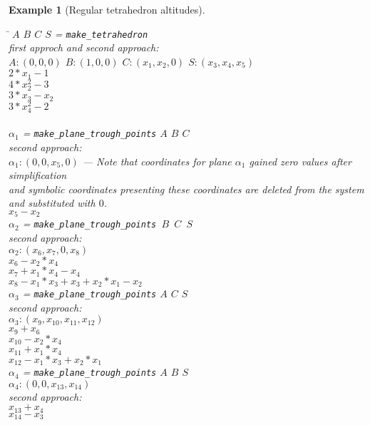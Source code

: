 \documentclass[final,1p,times,authoryear]{elsarticle}
\newtheorem{example}[theorem]{Example}
\begin{document}
\begin{example}[Regular tetrahedron altitudes]
\begin{footnotesize}
\begin{tabbing}
\hspace{5mm}\=\kill
\> $A$ $B$ $C$ $S$ = {\tt make\_tetrahedron}\\
  first approch and second approach: \\
  $A: (0, 0, 0)$ $ B: (1, 0, 0)$  $C: (x_1, x_2, 0)$ $S: (x_3, x_4, x_5)$ \\
  $2*x_1  - 1$ \\
  $4*x_2^2  -3$ \\
  $3*x_3  -  x_2$ \\
  $3*x_4^2  -2$ \\ \\
\> $\alpha_1$ = {\tt make\_plane\_trough\_points} $A$ $B$ $C$ \\
second approach: \\
 $\alpha_1 : (0, 0, x_5, 0)$ --- Note that coordinates for plane $\alpha_1$ gained zero values after simplification \\ and symbolic coordinates presenting these coordinates are deleted from the system and substituted with $0$. \\
 $x_5  -  x_2$ \\
\> $\alpha_2$ = {\tt make\_plane\_trough\_points $B$ $C$ $S$} \\
second approach: \\
$\alpha_2 : (x_6, x_7, 0, x_8)$ \\
 $x_6  -  x_2*x_4$ \\
 $x_7  +  x_1*x_4  -  x_4$ \\
 $x_8  -  x_1*x_3  +  x_3  +  x_2*x_1  -  x_2$ \\
\> $\alpha_3$ = {\tt make\_plane\_trough\_points} $A$ $C$ $S$ \\
second approach: \\
$\alpha_3 : (x_9, x_{10}, x_{11}, x_{12})$ \\
  $x_9  +  x_6$ \\
  $x_{10}  -  x_2*x_4$ \\
  $x_{11}  +  x_1*x_4$ \\
  $x_{12}  -  x_1*x_3  +  x_2*x_1$ \\
\> $\alpha_4$ = {\tt make\_plane\_trough\_points} $A$ $B$ $S$ \\
$\alpha_4 : (0, 0, x_{13}, x_{14})$ \\
second approach: \\
  $x_{13}  +  x_4$ \\
  $x_{14}  -  x_3$ \\

\end{tabbing}
\end{footnotesize}
\end{example}
\end{document}
